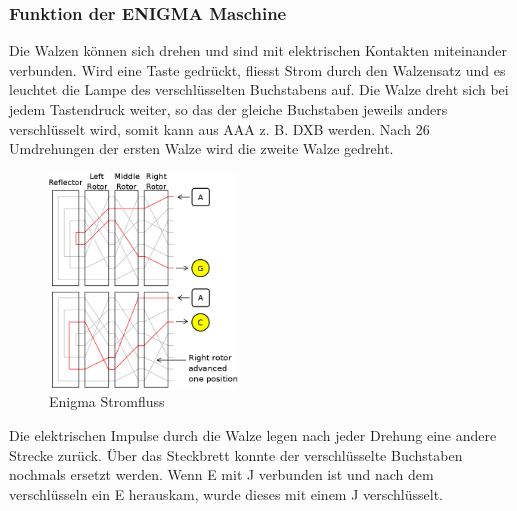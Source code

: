 \subsubsection{Funktion der ENIGMA Maschine}
Die Walzen können sich drehen und sind mit elektrischen Kontakten miteinander verbunden. Wird eine Taste gedrückt, fliesst Strom durch den Walzensatz und es leuchtet die Lampe des verschlüsselten Buchstabens auf. Die Walze dreht sich bei jedem Tastendruck weiter, so das der gleiche Buchstaben jeweils anders verschlüsselt wird, somit kann aus AAA z. B. DXB werden. Nach 26 Umdrehungen der ersten Walze wird die zweite Walze gedreht. \\
%
\begin{figure}[ht]
\begin{center}
\includegraphics[width=5cm]{images/Enigma-action.png}
\caption{Enigma Stromfluss}
\end{center}
\end{figure}
%
Die elektrischen Impulse durch die Walze legen nach jeder Drehung eine andere Strecke zurück. 
Über das Steckbrett konnte der verschlüsselte Buchstaben nochmals ersetzt werden. Wenn E mit J verbunden ist und nach dem verschlüsseln ein E herauskam, wurde dieses mit einem J verschlüsselt. 
%
